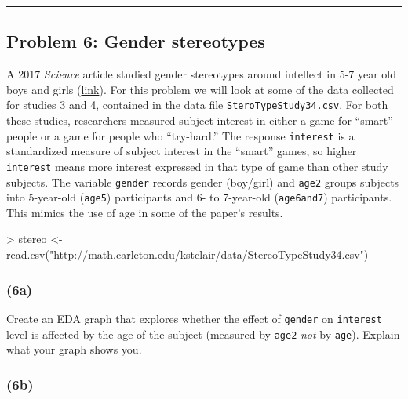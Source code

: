 \documentclass[
]{article}
\newenvironment{Shaded}{\begin{snugshade}}{\end{snugshade}}
\newcommand{\FunctionTok}[1]{\textcolor[rgb]{0.00,0.00,0.00}{#1}}
\newcommand{\NormalTok}[1]{#1}
\newcommand{\OtherTok}[1]{\textcolor[rgb]{0.56,0.35,0.01}{#1}}
\newcommand{\SpecialCharTok}[1]{\textcolor[rgb]{0.00,0.00,0.00}{#1}}
\newcommand{\StringTok}[1]{\textcolor[rgb]{0.31,0.60,0.02}{#1}}
\begin{document}
\begin{center}\rule{0.5\linewidth}{0.5pt}\end{center}

\hypertarget{problem-6-gender-stereotypes}{%
\subsection{Problem 6: Gender
stereotypes}\label{problem-6-gender-stereotypes}}

A 2017 \emph{Science} article studied gender stereotypes around
intellect in 5-7 year old boys and girls
(\href{http://science.sciencemag.org/content/355/6323/389}{link}). For
this problem we will look at some of the data collected for studies 3
and 4, contained in the data file \texttt{SteroTypeStudy34.csv}. For
both these studies, researchers measured subject interest in either a
game for ``smart'' people or a game for people who ``try-hard.'' The
response \texttt{interest} is a standardized measure of subject interest
in the ``smart'' games, so higher \texttt{interest} means more interest
expressed in that type of game than other study subjects. The variable
\texttt{gender} records gender (boy/girl) and \texttt{age2} groups
subjects into 5-year-old (\texttt{age5}) participants and 6- to
7-year-old (\texttt{age6and7}) participants. This mimics the use of age
in some of the paper's results.

\begin{Shaded}
\begin{Highlighting}[]
\SpecialCharTok{\textgreater{}}\NormalTok{ stereo }\OtherTok{\textless{}{-}} \FunctionTok{read.csv}\NormalTok{(}\StringTok{"http://math.carleton.edu/kstclair/data/StereoTypeStudy34.csv"}\NormalTok{)}
\end{Highlighting}
\end{Shaded}

\hypertarget{a-3}{%
\subsubsection{(6a)}\label{a-3}}

Create an EDA graph that explores whether the effect of \texttt{gender}
on \texttt{interest} level is affected by the age of the subject
(measured by \texttt{age2} \emph{not} by \texttt{age}). Explain what
your graph shows you.

\hypertarget{b-3}{%
\subsubsection{(6b)}\label{b-3}}
\end{document}
